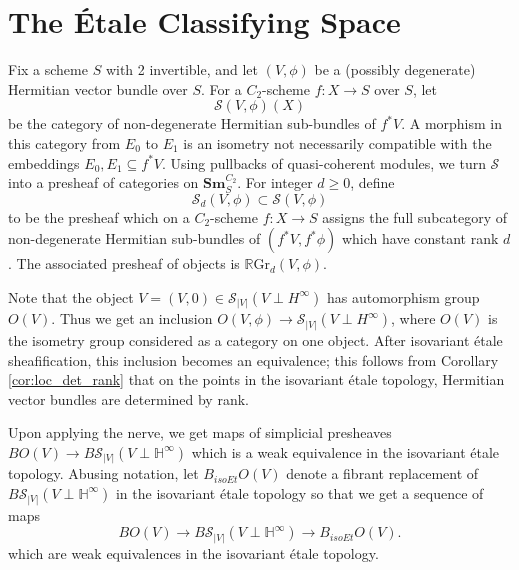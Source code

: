 \documentclass[edeposit,fullpage]{uiucthesis2009}
\newcommand{\mbb}{\mathbb}
\newcommand{\mc}{\mathcal}
\newcommand{\RGr}{\mathbb R\mathrm{Gr}}
\newcommand{\Sm}[1]{\mathbf{Sm}_{#1}}
\newcommand{\BigVB}[1]{\mathbf{BigVB}({#1})}
\DeclareMathOperator{\Hom}{Hom}
\DeclareMathOperator{\PreSm}{Pre_{Sm_S^{C_2}}}
\theoremstyle{plain}
\numberwithin{lemma}{section}
\theoremstyle{definition}
\begin{document}



\section{The \'Etale Classifying Space}

Fix a scheme $S$ with 2 invertible, and let $(V,\phi)$ be a
(possibly degenerate) Hermitian vector bundle over $S$. For a
$C_2$-scheme $f : X \rightarrow S$ over $S$, let
\[
\mc S(V,\phi)(X)
\]
be the category of non-degenerate Hermitian sub-bundles of $f^*V$. A
morphism in this category from $E_0$ to $E_1$ is an isometry not
necessarily compatible with the embeddings $E_0,E_1 \subseteq
f^*V$. Using pullbacks of quasi-coherent modules, we turn $\mc S$ into a presheaf of categories on
$\Sm{S}^{C_2}$. For integer $d \geq 0$, define
\[
\mc S_d(V,\phi)  \subset \mc S(V,\phi)
\]
to be the presheaf which on a $C_2$-scheme $f : X \rightarrow S$
assigns the full subcategory of non-degenerate Hermitian sub-bundles
of $(f^*V,f^*\phi)$ which have constant rank $d$. The associated
presheaf of objects is $\RGr_d(V,\phi)$.

Note that the object $V = (V,0) \in \mc S_{|V|}(V \perp H^\infty)$ has
automorphism group $O(V)$. Thus we get an inclusion $O(V,\phi)
\rightarrow \mc S_{|V|}(V \perp H^\infty) $, where $O(V)$ is the
isometry group considered as a category on one object. After isovariant \'etale
sheafification, this inclusion becomes an equivalence; this follows
from Corollary \ref{cor:loc_det_rank} that on the points in the isovariant \'etale
topology, Hermitian vector bundles are determined by rank.

Upon applying the nerve, we get maps of simplicial presheaves $BO(V)
\rightarrow B\mc S_{|V|}(V\perp \mbb H^\infty)$ which is a weak
equivalence in the isovariant \'etale topology. Abusing notation, let $B_{isoEt}O(V)$
denote a fibrant replacement of $B\mc S_{|V|}(V\perp \mbb H^\infty)$ in the isovariant
\'etale topology so that we get a sequence of maps
\[
BO(V) \rightarrow B\mc S_{|V|}(V\perp \mbb H^\infty) \rightarrow B_{isoEt}O(V).
\]
which are weak equivalences in the isovariant \'etale topology.
\end{document}
